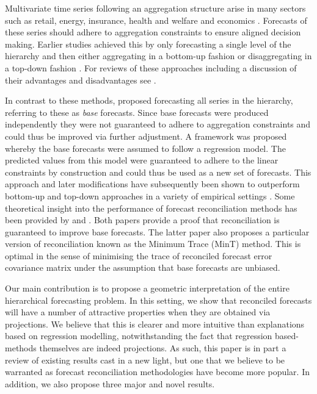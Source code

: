 \documentclass[12pt]{article}
\theoremstyle{definition}
\begin{document}
	Multivariate time series following an aggregation structure arise in many sectors such as retail, energy, insurance, health and welfare and economics \citep[see for example][]{KarMal2019, Taieb2017, NysEtAl2019, AlmVan2016, JeoEtAl2019, Mahkya2017, LiTan2019, Shang2017, AthEtAl2019_MacroBook}. Forecasts of these series should adhere to aggregation constraints to ensure aligned decision making. Earlier studies achieved this by only forecasting a single level of the hierarchy and then either aggregating in a bottom-up fashion \citep{Dunn1976} or disaggregating in a top-down fashion \citep{Gross1990, Athanasopoulos2009}.  For reviews of these approaches including a discussion of their advantages and disadvantages see \citet{Schwarzkopf1988, Kahn1998, Lapide1998, Fliedner2001}.
	
	In contrast to these methods, \cite{Hyndman2011} proposed forecasting all series in the hierarchy, referring to these as {\em base} forecasts.  Since base forecasts were produced independently they were not guaranteed to adhere to aggregation constraints and could thus be improved via further adjustment.  A framework was proposed whereby the base forecasts were assumed to follow a regression model.  The predicted values from this model were guaranteed to adhere to the linear constraints by construction and could thus be used as a new set of forecasts.  This approach and later modifications have subsequently been shown to outperform bottom-up and top-down approaches in a variety of empirical settings \citep[see for example][among others]{Athanasopoulos2009, AthEtAl2017, WicEtAl2019}.	Some theoretical insight into the performance of forecast reconciliation methods has been provided by \cite{VanErven2015a} and \cite{WicEtAl2019}.  Both papers provide a proof that reconciliation is guaranteed to improve base forecasts.  The latter paper also proposes a particular version of reconciliation known as the Minimum Trace (MinT) method.  This is optimal in the sense of minimising the trace of reconciled forecast error covariance matrix under the assumption that base forecasts are unbiased.
	
	Our main contribution is to propose a geometric interpretation of the entire hierarchical forecasting problem.  In this setting, we show that reconciled forecasts will have a number of attractive properties when they are obtained via projections.  We believe that this is clearer and more intuitive than explanations based on regression modelling, notwithstanding the fact that regression based-methods themselves are indeed projections.  As such, this paper is in part a review of existing results cast in a new light, but one that we believe to be warranted as forecast reconciliation methodologies have become more popular.  In addition, we also propose three major and novel results.
	
\end{document}
